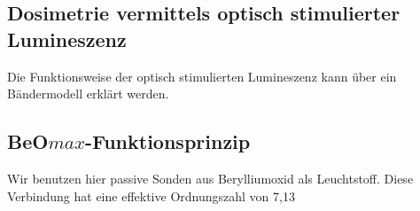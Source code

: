 \subsection{Dosimetrie vermittels optisch stimulierter Lumineszenz}

Die Funktionsweise der optisch stimulierten Lumineszenz kann über ein Bändermodell erklärt werden. 


\subsection{BeO$max$-Funktionsprinzip}
Wir benutzen hier passive Sonden aus Berylliumoxid als Leuchtstoff. Diese Verbindung hat eine effektive Ordnungszahl von 7,13
